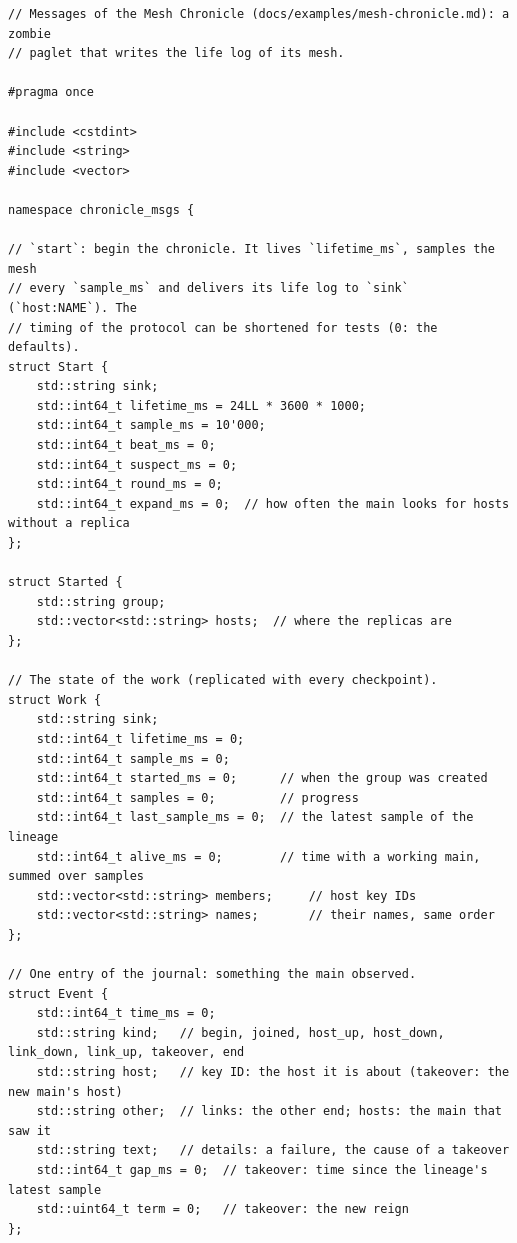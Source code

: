 \begin{lstlisting}[style=paglets-cpp,caption={The chronicle's messages, work and journal entries \src{cpp/examples/chronicle/chronicle\_msgs.hpp}},label={lst:app-chronicle-messages}]
// Messages of the Mesh Chronicle (docs/examples/mesh-chronicle.md): a zombie
// paglet that writes the life log of its mesh.

#pragma once

#include <cstdint>
#include <string>
#include <vector>

namespace chronicle_msgs {

// `start`: begin the chronicle. It lives `lifetime_ms`, samples the mesh
// every `sample_ms` and delivers its life log to `sink` (`host:NAME`). The
// timing of the protocol can be shortened for tests (0: the defaults).
struct Start {
    std::string sink;
    std::int64_t lifetime_ms = 24LL * 3600 * 1000;
    std::int64_t sample_ms = 10'000;
    std::int64_t beat_ms = 0;
    std::int64_t suspect_ms = 0;
    std::int64_t round_ms = 0;
    std::int64_t expand_ms = 0;  // how often the main looks for hosts without a replica
};

struct Started {
    std::string group;
    std::vector<std::string> hosts;  // where the replicas are
};

// The state of the work (replicated with every checkpoint).
struct Work {
    std::string sink;
    std::int64_t lifetime_ms = 0;
    std::int64_t sample_ms = 0;
    std::int64_t started_ms = 0;      // when the group was created
    std::int64_t samples = 0;         // progress
    std::int64_t last_sample_ms = 0;  // the latest sample of the lineage
    std::int64_t alive_ms = 0;        // time with a working main, summed over samples
    std::vector<std::string> members;     // host key IDs
    std::vector<std::string> names;       // their names, same order
};

// One entry of the journal: something the main observed.
struct Event {
    std::int64_t time_ms = 0;
    std::string kind;   // begin, joined, host_up, host_down, link_down, link_up, takeover, end
    std::string host;   // key ID: the host it is about (takeover: the new main's host)
    std::string other;  // links: the other end; hosts: the main that saw it
    std::string text;   // details: a failure, the cause of a takeover
    std::int64_t gap_ms = 0;  // takeover: time since the lineage's latest sample
    std::uint64_t term = 0;   // takeover: the new reign
};


\end{lstlisting}
